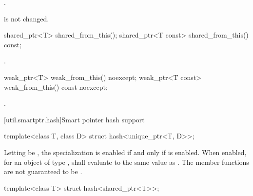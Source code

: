 \begin{itemdescr}
\pnum\returns  {}.

\pnum\begin{note}  is not changed. \end{note}
\end{itemdescr}

%
%
\begin{itemdecl}
shared_ptr<T>       shared_from_this();
shared_ptr<T const> shared_from_this() const;
\end{itemdecl}

\begin{itemdescr}
\pnum\returns  {}.
\end{itemdescr}

%
%
\begin{itemdecl}
weak_ptr<T>       weak_from_this() noexcept;
weak_ptr<T const> weak_from_this() const noexcept;
\end{itemdecl}

\begin{itemdescr}
\pnum\returns  {}.
\end{itemdescr}

[util.smartptr.hash]{Smart pointer hash support}

%
\begin{itemdecl}
template<class T, class D> struct hash<unique_ptr<T, D>>;
\end{itemdecl}

\begin{itemdescr}
\pnum
Letting  be ,
the specialization  is enabled
if and only if  is enabled.
When enabled, for an object  of type ,
 shall evaluate to
the same value as .
The member functions are not guaranteed to be .
\end{itemdescr}

%
\begin{itemdecl}
template<class T> struct hash<shared_ptr<T>>;
\end{itemdecl}

